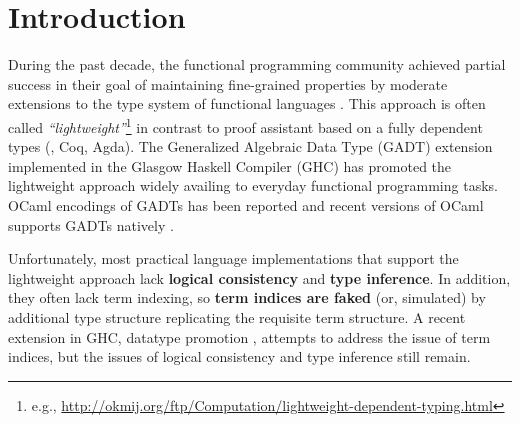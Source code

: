 \section{Introduction}
During the past decade, the functional programming community achieved
partial success in their goal of maintaining fine-grained properties
by moderate extensions to the type system of functional languages
\cite{CheHin03,CheHin02,Xi03}.
This approach is often called \emph{``lightweight''}\footnote{e.g.,
  \url{http://okmij.org/ftp/Computation/lightweight-dependent-typing.html} }
in contrast to proof assistant based on a fully dependent types
(\eg, Coq, Agda).
The Generalized Algebraic Data Type (GADT) extension implemented
in the Glasgow Haskell Compiler (GHC) has promoted the lightweight approach
widely availing to everyday functional programming tasks.
OCaml encodings of GADTs has been reported \cite{ManStu09}
and recent versions of OCaml supports GADTs natively \cite{GarNor11}.

Unfortunately, most practical language implementations that support
the lightweight approach lack \textbf{logical consistency} and
\textbf{type inference}. In addition,
they often lack term indexing, so \textbf{term indices are faked}
(or, simulated) by additional type structure replicating the requisite term
structure.
A recent extension in GHC, datatype promotion \cite{YorgeyWCJVM12},
attempts to address the issue of term indices, but the issues of
logical consistency and type inference still remain.

